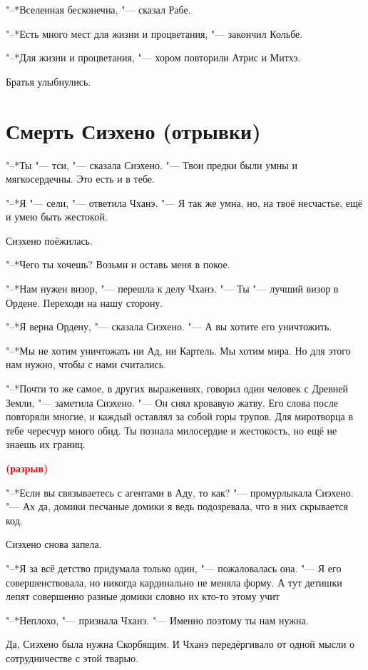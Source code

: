 \documentclass[a4paper,10pt,fleqn]{book}
\newcommand{\ldotst}{\so{...}\xspace}
\newcommand{\spacing}{\textcolor{red}{\textbf{(разрыв)}}}
\begin{document}
"--*Вселенная бесконечна, "--- сказал Рабе.

"--*Есть много мест для жизни и процветания, "--- закончил Кольбе.

"--*Для жизни и процветания, "--- хором повторили Атрис и Митхэ.

Братья улыбнулись.

\section{Смерть Сиэхено (отрывки)}

"--*Ты "--- тси, "--- сказала Сиэхено.
"--- Твои предки были умны и мягкосердечны.
Это есть и в тебе.

"--*Я "--- сели, "--- ответила Чханэ.
"--- Я так же умна, но, на твоё несчастье, ещё и умею быть жестокой.

Сиэхено поёжилась.

"--*Чего ты хочешь?
Возьми и оставь меня в покое.

"--*Нам нужен визор, "--- перешла к делу Чханэ.
"--- Ты "--- лучший визор в Ордене.
Переходи на нашу сторону.

"--*Я верна Ордену, "--- сказала Сиэхено.
"--- А вы хотите его уничтожить.

"--*Мы не хотим уничтожать ни Ад, ни Картель.
Мы хотим мира.
Но для этого нам нужно, чтобы с нами считались.

"--*Почти то же самое, в других выражениях, говорил один человек с Древней Земли, "--- заметила Сиэхено.
"--- Он снял кровавую жатву.
Его слова после повторяли многие, и каждый оставлял за собой горы трупов.
Для миротворца в тебе чересчур много обид.
Ты познала милосердие и жестокость, но ещё не знаешь их границ.

\spacing

"--*Если вы связываетесь с агентами в Аду, то как? "--- промурлыкала Сиэхено.
"--- Ах да, домики\ldotst песчаные домики\ldotst я ведь подозревала, что в них скрывается код.

Сиэхено снова запела.

"--*Я за всё детство придумала только один, "--- пожаловалась она.
"--- Я его совершенствовала, но никогда кардинально не меняла форму.
А тут детишки лепят совершенно разные домики\ldotst словно их кто-то этому учит\ldotst

"--*Неплохо, "--- признала Чханэ.
"--- Именно поэтому ты нам нужна.

Да, Сиэхено была нужна Скорбящим.
И Чханэ передёргивало от одной мысли о сотрудничестве с этой тварью.
\end{document}
